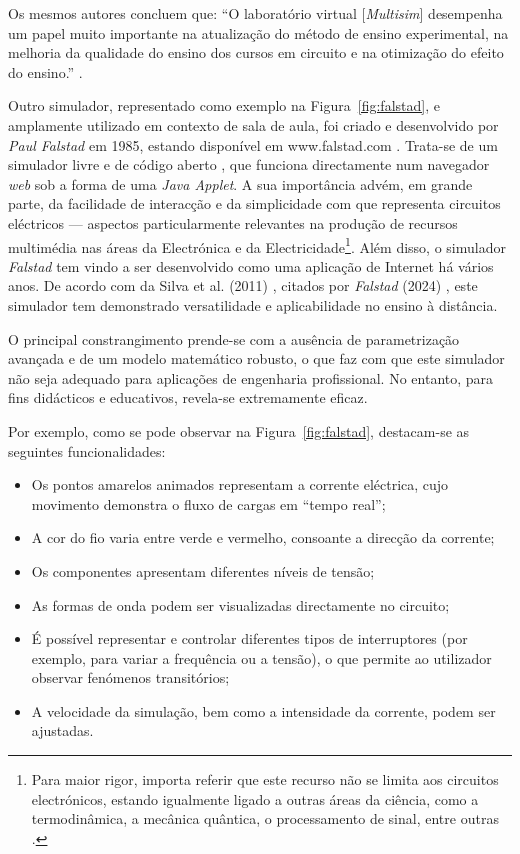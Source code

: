 Os mesmos autores concluem que: ``O laboratório virtual [\textit{Multisim}] desempenha um papel muito importante na atualização do método de ensino experimental, na melhoria da qualidade do ensino dos cursos em circuito e na otimização do efeito do ensino.'' \cite{heying}.

Outro simulador, representado como exemplo na Figura~\ref{fig:falstad}, e amplamente utilizado em contexto de sala de aula, foi criado e desenvolvido por \textit{Paul Falstad} em 1985, estando disponível em www.falstad.com \cite{falstad}. Trata-se de um simulador livre e de código aberto \cite{falstadlicenca}, que funciona directamente num navegador \textit{web} sob a forma de uma \textit{Java Applet}. A sua importância advém, em grande parte, da facilidade de interacção e da simplicidade com que representa circuitos eléctricos — aspectos particularmente relevantes na produção de recursos multimédia nas áreas da Electrónica e da Electricidade\footnote{Para maior rigor, importa referir que este recurso não se limita aos circuitos electrónicos, estando igualmente ligado a outras áreas da ciência, como a termodinâmica, a mecânica quântica, o processamento de sinal, entre outras \cite{falstadcompleto}.}. Além disso, o simulador \textit{Falstad} tem vindo a ser desenvolvido como uma aplicação de Internet há vários anos. De acordo com da Silva et al. (2011) \cite{RemoteTeachingElectricalCircuits}, citados por \textit{Falstad} (2024) \cite{falstad}, este simulador tem demonstrado versatilidade e aplicabilidade no ensino à distância.

O principal constrangimento prende-se com a ausência de parametrização avançada e de um modelo matemático robusto, o que faz com que este simulador não seja adequado para aplicações de engenharia profissional. No entanto, para fins didácticos e educativos, revela-se extremamente eficaz.

Por exemplo, como se pode observar na Figura~\ref{fig:falstad}, destacam-se as seguintes funcionalidades:

\begin{itemize}
    \item Os pontos amarelos animados representam a corrente eléctrica, cujo movimento demonstra o fluxo de cargas em ``tempo real'';
    \item A cor do fio varia entre verde e vermelho, consoante a direcção da corrente;
    \item Os componentes apresentam diferentes níveis de tensão;
    \item As formas de onda podem ser visualizadas directamente no circuito;
    \item É possível representar e controlar diferentes tipos de interruptores (por exemplo, para variar a frequência ou a tensão), o que permite ao utilizador observar fenómenos transitórios;
    \item A velocidade da simulação, bem como a intensidade da corrente, podem ser ajustadas.
\end{itemize}

